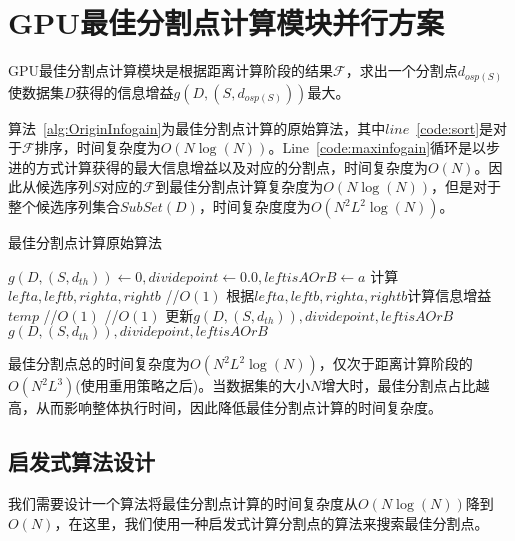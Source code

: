 \section{GPU最佳分割点计算模块并行方案}
\label{cha:chap04:myalg:infogain}

GPU最佳分割点计算模块是根据距离计算阶段的结果$\mathcal{F}$，求出一个分割点$d_{osp(S)}$使数据集$D$获得的信息增益$g(D,(S,d_{osp(S)}))$最大。

算法~\ref{alg:OriginInfogain}为最佳分割点计算的原始算法，其中$line$~\ref{code:sort}是对于$\mathcal{F}$排序，时间复杂度为$O(N\log(N))$。Line~\ref{code:maxinfogain}循环是以步进的方式计算获得的最大信息增益以及对应的分割点，时间复杂度为$O(N)$。因此从候选序列$S$对应的$\mathcal{F}$到最佳分割点计算复杂度为$O(N\log(N))$，但是对于整个候选序列集合$SubSet(D)$，时间复杂度度为$O(N^2L^2\log(N))$。

\begin{algorithm}
	\caption{最佳分割点计算原始算法}
	\label{alg:OriginInfogain}
	\begin{algorithmic}[1]
			\State {} \label{code:sort}
			\State $g(D,(S,d_{th}))\gets 0,dividepoint\gets 0.0,leftisAOrB\gets a$
			 \label{code:} \label{code:maxinfogain}
				\State 计算$lefta,leftb,righta,rightb$ //$O(1)$%
				\State 根据$lefta,leftb,righta,rightb$计算信息增益$temp$ //$O(1)$
				 //$O(1)$
					\State 更新$g(D,(S,d_{th})),dividepoint,leftisAOrB$
				\EndIf
			\EndFor
			\State \Return $g(D,(S,d_{th})),dividepoint,leftisAOrB$
		\EndFunction
	\end{algorithmic}
\end{algorithm}

最佳分割点总的时间复杂度为$O(N^2L^2\log(N))$，仅次于距离计算阶段的$O(N^2L^3)$(使用重用策略之后)。当数据集的大小$N$增大时，最佳分割点占比越高，从而影响整体执行时间，因此降低最佳分割点计算的时间复杂度。

\subsection{启发式算法设计}
\label{cha:chap04:myalg:infogain:design}

我们需要设计一个算法将最佳分割点计算的时间复杂度从$O(N\log(N))$降到$O(N)$，在这里，我们使用一种启发式计算分割点的算法来搜索最佳分割点。

